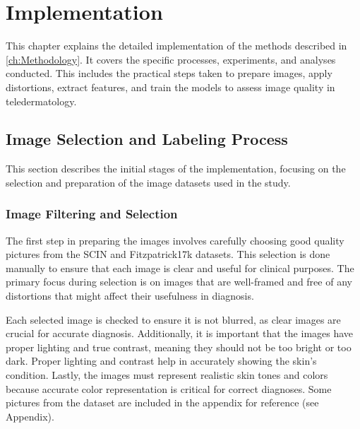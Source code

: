 \chapter{Implementation}
\label{ch:Implementation}
This chapter explains the detailed implementation of the methods described in \autoref{ch:Methodology}. It covers the specific processes, experiments, and analyses conducted. This includes the practical steps taken to prepare images, apply distortions, extract features, and train the models to assess image quality in teledermatology. \par

\section{Image Selection and Labeling Process}
\label{sec:ImgSelectLabel}
This section describes the initial stages of the implementation, focusing on the selection and preparation of the image datasets used in the study. \par

\subsection{Image Filtering and Selection}
\label{sub:ImgFilterSelect}
The first step in preparing the images involves carefully choosing good quality pictures from the SCIN and Fitzpatrick17k datasets. This selection is done manually to ensure that each image is clear and useful for clinical purposes. The primary focus during selection is on images that are well-framed and free of any distortions that might affect their usefulness in diagnosis. \par
\vspace{\baselineskip}
\noindent
Each selected image is checked to ensure it is not blurred, as clear images are crucial for accurate diagnosis. Additionally, it is important that the images have proper lighting and true contrast, meaning they should not be too bright or too dark. Proper lighting and contrast help in accurately showing the skin’s condition. Lastly, the images must represent realistic skin tones and colors because accurate color representation is critical for correct diagnoses. Some pictures from the dataset are included in the appendix for reference (see Appendix). \par

